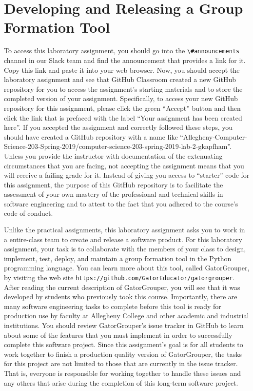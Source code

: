 \documentclass[11pt]{article}
\newcommand{\url}[1]{\lstinline{#1}}
\newcommand{\channel}[1]{\lstinline{#1}}
\begin{document}
\section*{Developing and Releasing a Group Formation Tool}


To access this laboratory assignment, you should go into the
\channel{\#announcements} channel in our Slack team and find the announcement
that provides a link for it. Copy this link and paste it into your web browser.
Now, you should accept the laboratory assignment and see that GitHub Classroom
created a new GitHub repository for you to access the assignment's starting
materials and to store the completed version of your assignment. Specifically,
to access your new GitHub repository for this assignment, please click the green
``Accept'' button and then click the link that is prefaced with the label ``Your
assignment has been created here''. If you accepted the assignment and correctly
followed these steps, you should have created a GitHub repository with a name
like
``Allegheny-Computer-Science-203-Spring-2019/computer-science-203-spring-2019-lab-2-gkapfham''.
Unless you provide the instructor with documentation of the extenuating
circumstances that you are facing, not accepting the assignment means that you
will receive a failing grade for it.
%
Instead of giving you access to ``starter'' code for this assignment, the
purpose of this GitHub repository is to facilitate the assessment of your own
mastery of the professional and technical skills in software engineering and to
attest to the fact that you adhered to the course's code of conduct.


Unlike the practical assignments, this laboratory assignment asks you to work in
a entire-class team to create and release a software product.
%
For this laboratory assignment, your task is to collaborate with the members of
your class to design, implement, test, deploy, and maintain a group formation
tool in the Python programming language.
%
You can learn more about this tool, called GatorGrouper, by visiting the web
site \url{https://github.com/GatorEducator/gatorgrouper}. After reading the
current description of GatorGrouper, you will see that it was developed by
students who previously took this course.
%
Importantly, there are many software engineering tasks to complete before this
tool is ready for production use by faculty at Allegheny College and other
academic and industrial institutions. You should review GatorGrouper's issue
tracker in GitHub to learn about some of the features that you must implement in
order to successfully complete this software project. Since this assignment's
goal is for all students to work together to finish a production quality version
of GatorGrouper, the tasks for this project are not limited to those that are
currently in the issue tracker. That is, everyone is responsible for working
together to handle these issues and any others that arise during the completion
of this long-term software project.
\end{document}
